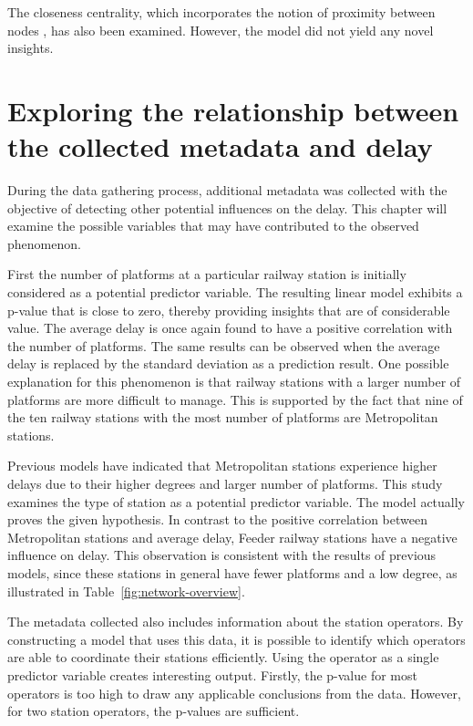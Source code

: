 \documentclass[12pt,a4paper]{article}
\begin{document}
The closeness centrality, which incorporates the notion of proximity between nodes \citep[p.~180]{Rodrigues2019}, has also been examined. However, the model did not yield any novel insights.

\maketitle
\section{\label{sec:RealtionshipMeta}Exploring the relationship between the collected metadata and delay}

During the data gathering process, additional metadata was collected with the objective of detecting other potential influences on the delay. 
This chapter will examine the possible variables that may have contributed to the observed phenomenon.

First the number of platforms at a particular railway station is initially considered as a potential predictor variable. The resulting linear model exhibits a p-value that is close to zero, thereby providing insights that are of considerable value. The average delay is once again found to have a positive correlation with the number of platforms. The same results can be observed when the average delay is replaced by the standard deviation as a prediction result. One possible explanation for this phenomenon is that railway stations with a larger number of platforms are more difficult to manage.
This is supported by the fact that nine of the ten railway stations with the most number of platforms are Metropolitan stations.

Previous models have indicated that Metropolitan stations experience higher delays due to their higher degrees and larger number of platforms. This study examines the type of station as a potential predictor variable. The model actually proves the given hypothesis. In contrast to the positive correlation between Metropolitan stations and average delay, Feeder railway stations have a negative influence on delay. 
This observation is consistent with the results of previous models, since these stations in general have fewer platforms and a low degree, as illustrated in Table~\ref{fig:network-overview}.

The metadata collected also includes information about the station operators. By constructing a model that uses this data, it is possible to identify which operators are able to coordinate their stations efficiently. Using the operator as a single predictor variable creates interesting output. 
Firstly, the p-value for most operators is too high to draw any applicable conclusions from the data. 
However, for two station operators, the p-values are sufficient. 
\end{document}
